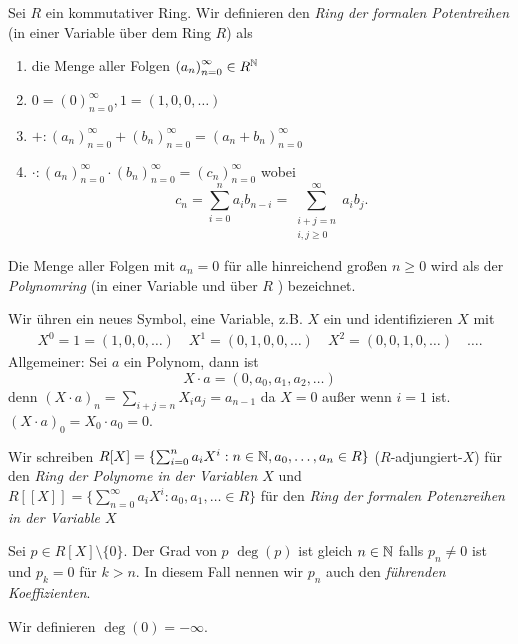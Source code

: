 \begin{definition}
	Sei $R$ ein kommutativer Ring. Wir definieren den \emph{Ring der formalen Potentreihen} (in einer Variable über dem Ring $R $) als 
	\begin{enumerate}
		\item die Menge aller Folgen $\left(a_{n}\right)^{\infty}_{n=0} \in R^{\mathbb{N}}$
		\item $0 = \left(0\right)^{\infty}_{n=0}, 1 = (1,0,0,\ldots)$ 
		\item $+: \left(a_{n}\right)^{\infty}_{n=0} + \left(b_{n}\right)^{\infty}_{n=0} = (a_{n} + b_{n})^{\infty}_{n=0}$ 
		\item $\cdot: \left(a_{n}\right)^{\infty}_{n=0} \cdot \left(b_{n}\right)^{\infty}_{n=0} = \left(c_{n}\right)^{\infty}_{n=0} $ wobei
			\[
				c_{n} = \sum_{i=0}^{n} a_{i} b_{n-i} = \sum_{\substack{i+j=n \\ i,j \geq 0}}^{\infty} a_{i} b_{j}
			.\] 
	\end{enumerate}
	Die Menge aller Folgen mit $a_{n} = 0$ für alle hinreichend großen $n \geq 0$ wird als der \emph{Polynomring} (in einer Variable und über $R$ ) bezeichnet.
\end{definition}


\begin{notation}
	Wir ühren ein neues Symbol, eine Variable, z.B. $X$ ein und identifizieren $X$ mit
	\begin{align*}
		X^{0} = 1 = (1,0,0,\ldots) \quad X^{1} = (0,1,0,0,\ldots) \quad X^2 = (0,0,1,0,\ldots) \quad \ldots
	.\end{align*}
	Allgemeiner: Sei $a$ ein Polynom, dann ist
	\[
		X \cdot a = (0,a_0,a_1,a_2,\ldots)
	\]
	denn $(X\cdot a)_{n} = \sum_{i+j=n} X_{i} a_{j} = a_{n-1}$ 
	da $X = 0$ außer wenn $i = 1$ ist. $(X\cdot a)_{0} = X_0\cdot a_0 = 0$.

	Wir schreiben $R[X] = \{\sum_{i=0}^{n} a_{i} X^{i} : n \in \mathbb{N}, a_0,\ldots,a_{n} \in R\}$ ($R$-adjungiert-$X$) für den \emph{Ring der Polynome in der Variablen $X$}
	und $R[\![ X ]\!] = \{\sum_{n=0}^{\infty} a_{i} X^{i} : a_0,a_1,\ldots \in R\} $ für den \emph{Ring der formalen Potenzreihen in der Variable $X$}
\end{notation}

\begin{definition}
	Sei $p \in R[X] \setminus \{0\}$. Der Grad von $p$ $\deg(p)$ ist gleich $n \in \mathbb{N}$ falls $p_{n} \neq 0$ ist und
	$p_{k} = 0$ für $k> n$. In diesem Fall nennen wir $p_{n}$ auch den \emph{führenden Koeffizienten}.
	
	Wir definieren $\deg(0) = - \infty$.
\end{definition}

